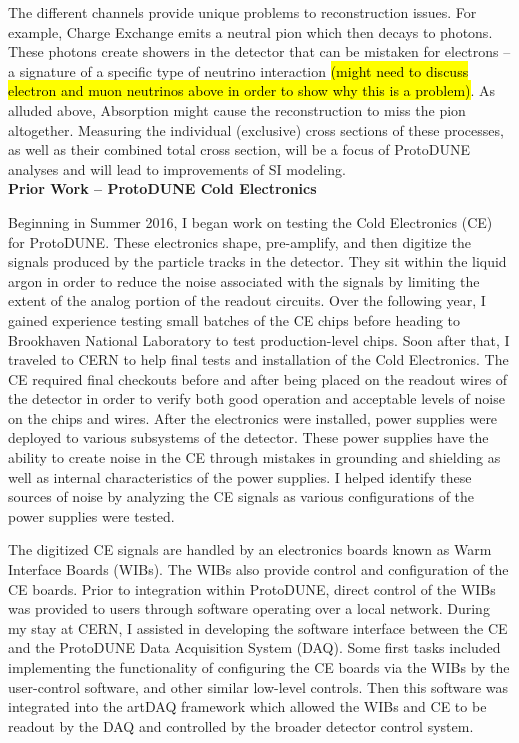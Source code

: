 \documentclass[12pt]{article}
\begin{document}
	
	The different channels provide unique problems to reconstruction issues. For example, Charge Exchange emits a neutral pion which then decays to photons. These photons create showers in the detector that can be mistaken for electrons – a signature of a specific type of neutrino interaction \hl{(might need to discuss electron and muon neutrinos above in order to show why this is a problem)}. As alluded above, Absorption might cause the reconstruction to miss the pion altogether. Measuring the individual (exclusive) cross sections of these processes, as well as their combined total cross section, will be a focus of ProtoDUNE analyses and will lead to improvements of SI modeling. 
\\

\textbf{Prior Work – ProtoDUNE Cold Electronics}

	Beginning in Summer 2016, I began work on testing the Cold Electronics (CE) for ProtoDUNE. These electronics shape, pre-amplify, and then digitize the signals produced by the particle tracks in the detector. They sit within the liquid argon in order to reduce the noise associated with the signals by limiting the extent of the analog portion of the readout circuits. Over the following year, I gained experience testing small batches of the CE chips before heading to Brookhaven National Laboratory to test production-level chips. Soon after that, I traveled to CERN to help final tests and installation of the Cold Electronics. The CE required final checkouts before and after being placed on the readout wires of the detector in order to verify both good operation and acceptable levels of noise on the chips and wires. After the electronics were installed, power supplies were deployed to various subsystems of the detector. These power supplies have the ability to create noise in the CE through mistakes in grounding and shielding as well as internal characteristics of the power supplies. I helped identify these sources of noise by analyzing the CE signals as various configurations of the power supplies were tested.
	
	The digitized CE signals are handled by an electronics boards known as Warm Interface Boards (WIBs). The WIBs also provide control and configuration of the CE boards. Prior to integration within ProtoDUNE, direct control of the WIBs was provided to users through software operating over a local network. During my stay at CERN, I assisted in developing the software interface between the CE and the ProtoDUNE Data Acquisition System (DAQ). Some first tasks included implementing the functionality of configuring the CE boards via the WIBs by the user-control software, and other similar low-level controls. Then this software was integrated into the artDAQ framework which allowed the WIBs and CE to be readout by the DAQ and controlled by the broader detector control system.
\\
\end{document}

